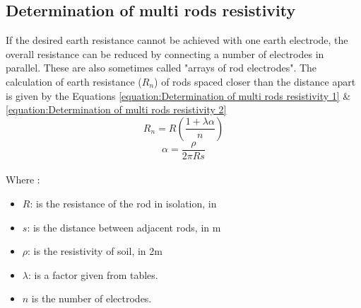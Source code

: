 \documentclass[12pt,fleqn]{book} %
\begin{document}
\subsection{Determination of multi rods resistivity}
If the desired earth resistance cannot be achieved with one earth electrode, the overall resistance can be reduced by connecting a number of electrodes in parallel. These are also sometimes called "arrays of rod electrodes".
The calculation of earth resistance ($R_{n}$) of rods spaced closer than the distance apart is given by the  Equations \ref{equation:Determination of multi rods resistivity 1} \& \ref{equation:Determination of multi rods resistivity 2}
\begin{equation}
    R_{n}=R \left ( \frac{1+\lambda \alpha }{n} \right )
    \label{equation:Determination of multi rods resistivity 1}
\end{equation}
\begin{equation}
    \alpha = \frac{\rho}{2\pi Rs }
    \label{equation:Determination of multi rods resistivity 2}
\end{equation}
\\ Where :
\begin{itemize}
    \item $R$: is the resistance of the rod in isolation, in
    \item $s$: is the distance between adjacent rods, in m
    \item $\rho$: is the resistivity of soil, in 2m
    \item $\lambda$: is a factor given from tables.
    \item $n$  is the number of electrodes.
\end{itemize}
\end{document}
